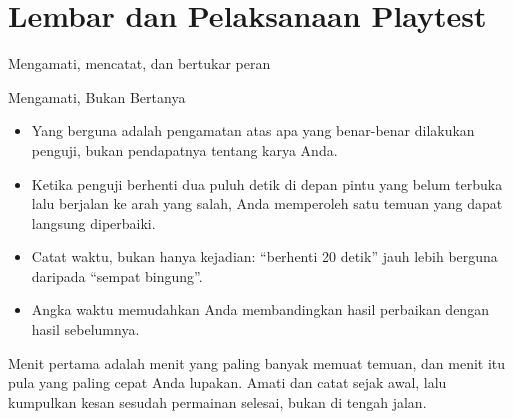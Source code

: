 \documentclass[aspectratio=169,10pt]{beamer}
\begin{document}
\section{Lembar dan Pelaksanaan Playtest}
  {Mengamati, mencatat, dan bertukar peran}

\begin{frame}{Mengamati, Bukan Bertanya}
\begin{itemize}
  \item Yang berguna adalah pengamatan atas apa yang benar-benar dilakukan
        penguji, bukan pendapatnya tentang karya Anda.
  \item Ketika penguji berhenti dua puluh detik di depan pintu yang belum
        terbuka lalu berjalan ke arah yang salah, Anda memperoleh satu temuan
        yang dapat langsung diperbaiki.
  \item Catat waktu, bukan hanya kejadian: ``berhenti 20 detik'' jauh lebih
        berguna daripada ``sempat bingung''.
  \item Angka waktu memudahkan Anda membandingkan hasil perbaikan dengan hasil
        sebelumnya.
\end{itemize}
\vspace{0.14cm}
\begin{kiat}
Menit pertama adalah menit yang paling banyak memuat temuan, dan menit itu pula
yang paling cepat Anda lupakan. Amati dan catat sejak awal, lalu kumpulkan
kesan sesudah permainan selesai, bukan di tengah jalan.
\end{kiat}
\end{frame}
\end{document}
